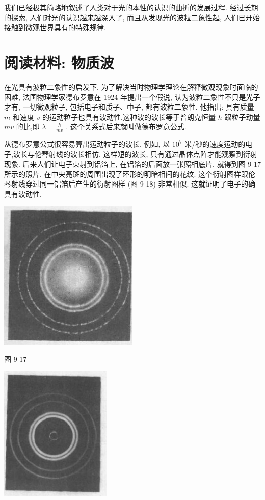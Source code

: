 \documentclass[10pt]{article}
\begin{document}
我们已经极其简略地叙述了人类对于光的本性的认识的曲折的发展过程. 经过长期的探索, 人们对光的认识越来越深入了, 而且从发现光的波粒二象性起, 人们已开始接触到微观世界具有的特殊规律.

\section*{阅读材料: 物质波}

在光具有波粒二象性的启发下, 为了解决当时物理学理论在解释微观现象时面临的困难, 法国物理学家德布罗意在 1924 年提出一个假说, 认为波粒二象性不只是光子才有, 一切微观粒子, 包括电子和质子、中子, 都有波粒二象性. 他指出: 具有质量 \(m\) 和速度 \(v\) 的运动粒子也具有波动性,这种波的波长等于普朗克恒量 \(h\) 跟粒子动量 \({mv}\) 的比,即 \(\lambda = \frac{h}{mv}\) . 这个关系式后来就叫做德布罗意公式.

从德布罗意公式很容易算出运动粒子的波长. 例如, 以 \({10}^{7}\) 米/秒的速度运动的电子,波长与伦琴射线的波长相仿. 这样短的波长, 只有通过晶体点阵才能观察到衍射现象. 后来人们让电子束射到铝箔上, 在铝箔的后面放一张照相底片, 就得到图 9-17 所示的照片, 在中央亮斑的周围出现了环形的明暗相间的花纹. 这个衍射图样跟伦琴射线穿过同一铝箔后产生的衍射图样 (图 9-18) 非常相似. 这就证明了电子的确具有波动性.

\begin{center}
\includegraphics[max width=0.5\textwidth]{images/01913056-1f15-74d8-9184-9aab52c9d66b_324_865844.jpg}
\end{center}

图 9-17

\begin{center}
\includegraphics[max width=0.4\textwidth]{images/01913056-1f15-74d8-9184-9aab52c9d66b_324_655193.jpg}
\end{center}
\end{document}
